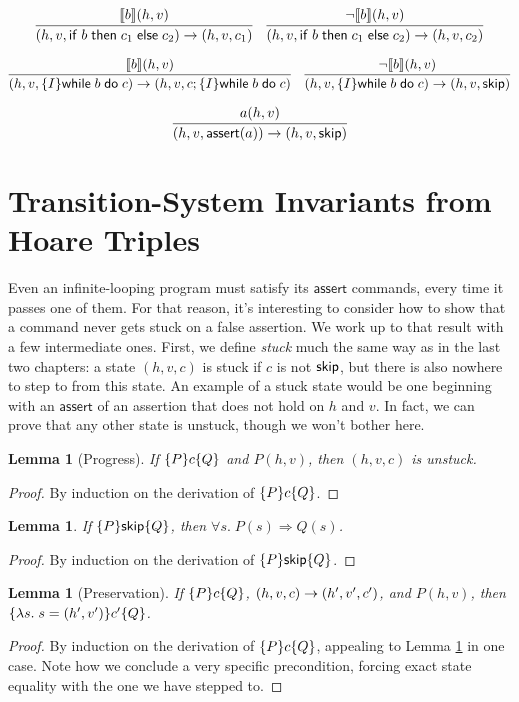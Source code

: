 \documentclass{amsbook}
\newtheorem{lemma}[theorem]{Lemma}
\theoremstyle{definition}
\theoremstyle{remark}
\numberwithin{section}{chapter}
\numberwithin{equation}{chapter}
\begin{document}
$$\infer{\smallstep{(h, v, \ifte{b}{c_1}{c_2})}{(h, v, c_1)}}{
  \denote{b}(h, v)
}
\quad \infer{\smallstep{(h, v, \ifte{b}{c_1}{c_2})}{(h, v, c_2)}}{
  \neg \denote{b}(h, v)
}$$

$$\infer{\smallstep{(h, v, \{I\} \while{b}{c})}{(h, v, c; \{I\} \while{b}{c})}}{
  \denote{b}(h, v)
}
\quad \infer{\smallstep{(h, v, \{I\} \while{b}{c})}{(h, v, \skipe)}}{
  \neg \denote{b}(h, v)
}$$

$$\infer{\smallstep{(h, v, \assert{a})}{(h, v, \skipe)}}{
  a(h, v)
}$$


\section{Transition-System Invariants from Hoare Triples}

Even an infinite-looping program must satisfy its $\mathsf{assert}$ commands, every time it passes one of them.
For that reason, it's interesting to consider how to show that a command never gets stuck on a false assertion.
We work up to that result with a few intermediate ones.
First, we define \emph{stuck} much the same way as in the last two chapters: a state $(h, v, c)$ is stuck if $c$ is not $\mathsf{skip}$, but there is also nowhere to step to from this state.
An example of a stuck state would be one beginning with an $\mathsf{assert}$ of an assertion that does not hold on $h$ and $v$.
In fact, we can prove that any other state is unstuck, though we won't bother here.

\begin{lemma}[Progress]\label{hoare_progress}
  If $\{P\} c \{Q\}$ and $P(h, v)$, then $(h, v, c)$ is unstuck.
\end{lemma}
\begin{proof}
  By induction on the derivation of $\{P\} c \{Q\}$.
\end{proof}

\begin{lemma}\label{hoare_skip}
  If $\{P\} \mathsf{skip} \{Q\}$, then $\forall s. \; P(s) \Rightarrow Q(s)$.
\end{lemma}
\begin{proof}
  By induction on the derivation of $\{P\} \mathsf{skip} \{Q\}$.
\end{proof}

\begin{lemma}[Preservation]\label{hoare_preservation}
  If $\{P\} c \{Q\}$, $(h, v, c) \to (h', v', c')$, and $P(h, v)$, then $\{\lambda s. \; s = (h', v')\} c' \{Q\}$.
\end{lemma}
\begin{proof}
  By induction on the derivation of $\{P\} c \{Q\}$, appealing to Lemma \ref{hoare_skip} in one case.  Note how we conclude a very specific precondition, forcing exact state equality with the one we have stepped to.
\end{proof}
\end{document}

